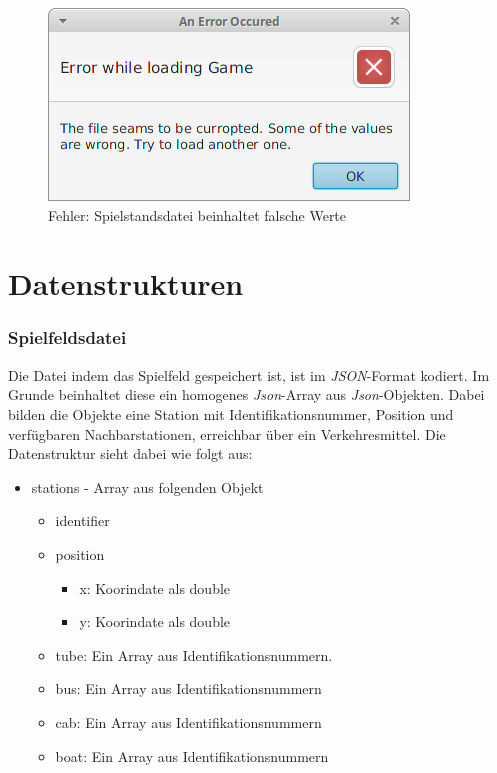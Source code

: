         \begin{figure}[H]
            \centering
            \includegraphics[scale=0.7]{img/benutzerhandbuch/error_savevalue.png}   
            \caption{Fehler: Spielstandsdatei beinhaltet falsche Werte}
        \end{figure}


    \section{Datenstrukturen}\label{Datenstrukturen}
        \subsubsection{Spielfeldsdatei}\label{Spielfeldsdatei}
            Die Datei indem das Spielfeld gespeichert ist, ist im \textit{JSON}-Format kodiert.
            Im Grunde beinhaltet diese ein homogenes \textit{Json}-Array aus \textit{Json}-Objekten.
            Dabei bilden die Objekte eine Station mit Identifikationsnummer, Position und verfügbaren Nachbarstationen, erreichbar über ein Verkehresmittel.
            Die Datenstruktur sieht dabei wie folgt aus:

            \begin{itemize}
                \item stations - Array aus folgenden Objekt
                    \begin{itemize}
                        \item identifier
                        \item position
                            \begin{itemize}
                                \item x: Koorindate als double
                                \item y: Koorindate als double
                            \end{itemize}
                        \item tube: Ein Array aus Identifikationsnummern.
                        \item bus: Ein Array aus Identifikationsnummern
                        \item cab: Ein Array aus Identifikationsnummern
                        \item boat: Ein Array aus Identifikationsnummern
                    \end{itemize}
            \end{itemize}

